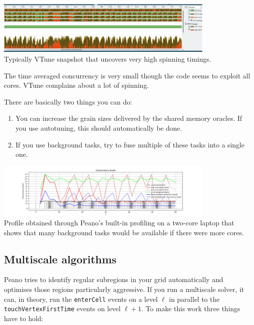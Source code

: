 \begin{center}
 \includegraphics[width=0.8\textwidth]{67_shared-memory-tuning/vtune.png}
 \\
 {\footnotesize
  Typically VTune snapshot that uncovers very high spinning timings.  
 }
\end{center}

\begin{smell}
  The time averaged concurrency is very small though the code seems to exploit
  all cores. VTune complains about a lot of spinning.
\end{smell}

\noindent
There are basically two things you can do: 

\begin{enumerate}
  \item You can increase the grain sizes delivered by the shared memory oracles.
  If you use autotuning, this should automatically be done.
  \item If you use background tasks, try to fuse multiple of these tasks into
  a single one.
\end{enumerate}


\begin{center}
 \includegraphics[width=0.8\textwidth]{67_shared-memory-tuning/concurrency.png}
 \\
 {\footnotesize
  Profile obtained through Peano's built-in profiling on a two-core laptop that
  shows that many background tasks would be available if there were more cores.
 }
\end{center}


\subsection{Multiscale algorithms}

Peano tries to identify regular subregions in your grid automatically and
optimises those regions particularly aggressive.
If you run a multiscale solver, it can, in theory, run the \texttt{enterCell}
events on a level $\ell $ in parallel to the \texttt{touchVertexFirstTime}
events on level $\ell +1$.
To make this work three things have to hold:

